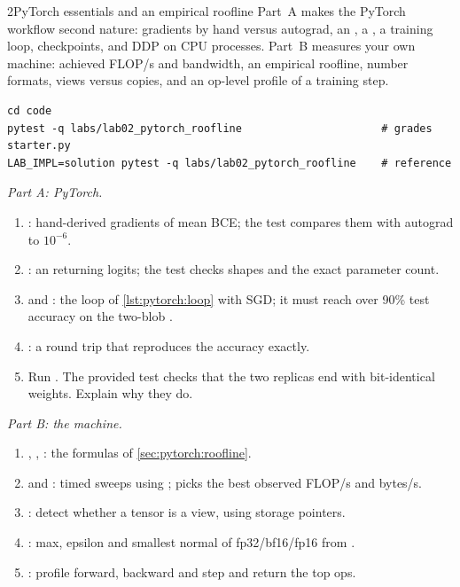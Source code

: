 \begin{labbox}{2}{PyTorch essentials and an empirical roofline}
Part~A makes the PyTorch workflow second nature: gradients by hand versus autograd, an ,
a , a training loop, checkpoints, and DDP on CPU processes. Part~B measures your own machine:
achieved FLOP/s and bandwidth, an empirical roofline, number formats, views versus copies, and an op-level
profile of a training step.

\begin{lstlisting}[style=shell]
cd code
pytest -q labs/lab02_pytorch_roofline                      # grades starter.py
LAB_IMPL=solution pytest -q labs/lab02_pytorch_roofline    # reference
\end{lstlisting}

\textit{Part A: PyTorch.}
\begin{enumerate}
\item {}: hand-derived gradients of mean BCE; the test compares
  them with autograd to $10^{-6}$.
\item {}: an  returning logits; the test checks shapes
  and the exact parameter count.
\item {} and : the loop of \cref{lst:pytorch:loop} with SGD; it must reach
  over 90\% test accuracy on the two-blob .
\item {}: a  round trip that reproduces the accuracy exactly.
\item Run . The provided test checks that the two replicas end with
  bit-identical weights. Explain why they do.
\end{enumerate}
\textit{Part B: the machine.}
\begin{enumerate}[resume]
\item {}, , : the formulas of
  \cref{sec:pytorch:roofline}.
\item {} and : timed sweeps using
  ;  picks the best observed FLOP/s and bytes/s.
\item {}: detect whether a tensor is a view, using storage pointers.
\item {}: max, epsilon and smallest normal of fp32/bf16/fp16 from .
\item {}: profile forward, backward and step and return the top ops.
\end{enumerate}


\end{labbox}
